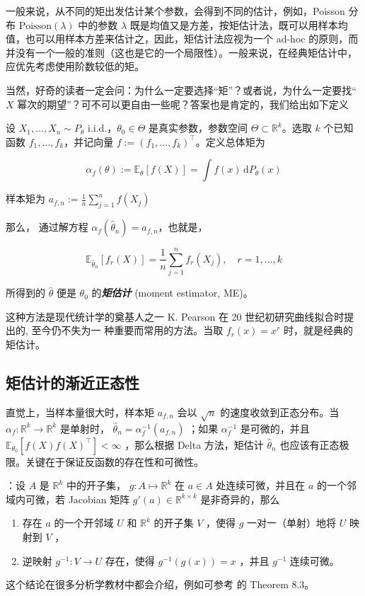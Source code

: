 一般来说，从不同的矩出发估计某个参数，会得到不同的估计，例如，Poisson 分布 $\mathrm{Poisson}(\lambda)$ 中的参数 $\lambda$ 既是均值又是方差，按矩估计法，既可以用样本均值，也可以用样本方差来估计之，因此，矩估计法应视为一个 ad-hoc 的原则，而并没有一个一般的准则（这也是它的一个局限性）。一般来说，在经典矩估计中，应优先考虑使用阶数较低的矩。

当然，好奇的读者一定会问：为什么一定要选择``矩''？或者说，为什么一定要找`` $X$ 幂次的期望''？可不可以更自由一些呢？答案也是肯定的，我们给出如下定义

\begin{definition*}[矩估计]
设 $X_1,\ldots,X_n\sim P_\theta$ i.i.d.，$\theta_0\in\Theta$ 是真实参数，参数空间 $\Theta\subset\mathbb R^k$。选取 $k$ 个已知函数 $f_1,\ldots,f_k$，并记向量 $f:=(f_1,\ldots,f_k)^\top$。定义总体矩为

$$\alpha_f(\theta):=\mathbb{E}_\theta[f(X)] = \int f(x)\,\mathrm{d}P_\theta(x)$$

样本矩为 $a_{f,n}:=\frac1n\sum_{j=1}^nf(X_j)$

那么， 通过解方程 $\alpha_f(\widehat\theta_n)=a_{f,n}$，也就是， 

$$\mathbb{E}_{\widehat \theta_n}[f_r(X)]=\frac{1}{n}\sum_{j=1}^n f_r(X_j),\quad r=1,\dots,k$$

所得到的 $\widehat\theta$ 便是 $\theta_0$ 的\textbf{\emph{矩估计 }} (moment estimator, ME)。
\end{definition*}
这种方法是现代统计学的奠基人之一 K. Pearson 在 20 世纪初研究曲线拟合时提出的, 至今仍不失为一 种重要而常用的方法。当取 $f_r(x)=x^r$ 时，就是经典的矩估计。

\subsection{矩估计的渐近正态性}

直觉上，当样本量很大时，样本矩 $a_{f,n}$ 会以 $\sqrt{n}$ 的速度收敛到正态分布。当 $\alpha_f:\mathbb R^k\to\mathbb R^k$ 是单射时， $\widehat\theta_n=\alpha_f^{-1}(a_{f,n})$ ；如果 $\alpha_f^{-1}$ 是可微的，并且 $\mathbb{E}_{\theta_0}[f(X)f(X)^\top]<\infty$ ，那么根据 Delta 方法，矩估计 $\widehat{\theta}_n$ 也应该有正态极限。关键在于保证反函数的存在性和可微性。

\begin{theorem*}[逆映射定理]：设 $A$ 是 $\mathbb R^k$ 中的开子集， $g:A\mapsto \mathbb R^k$ 在 $a\in A$ 处连续可微，并且在 $a$ 的一个邻域内可微，若 Jacobian 矩阵 $g'(a)\in\mathbb R^{k\times k}$ 是非奇异的，那么

\begin{enumerate}
\def\labelenumi{\arabic{enumi}.}
\tightlist
\item
  存在 $a$ 的一个开邻域 $U$ 和 $\mathbb R^k$ 的开子集 $V$ ，使得 $g$ 一对一（单射）地将 $U$ 映射到 $V$ ，
\item
  逆映射 $g^{-1}:V\to U$ 存在，使得 $g^{-1}(g(x))=x$ ，并且 $g^{-1}$ 连续可微。
\end{enumerate}

这个结论在很多分析学教材中都会介绍，例如可参考 \cite{munkres1997} 的 Theorem 8.3。

\end{theorem*}

